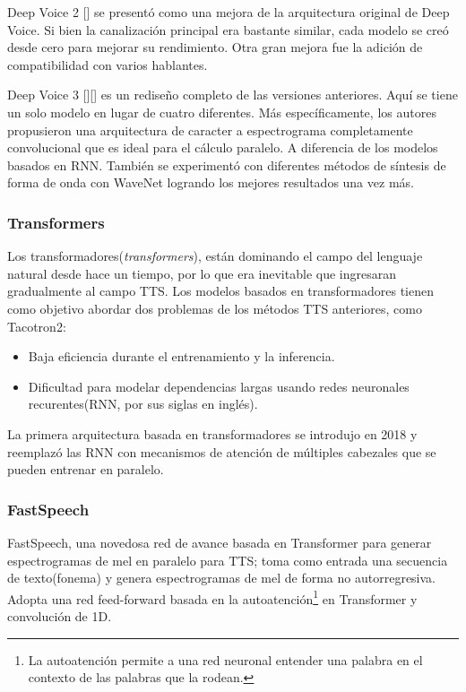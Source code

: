 Deep Voice 2 [\cite{arik2018neural}]  se presentó como una mejora de la arquitectura original de Deep Voice. Si bien la canalización principal era bastante similar, cada modelo se creó desde cero para mejorar su rendimiento. Otra gran mejora fue la adición de compatibilidad con varios hablantes.

Deep Voice 3 [\cite{arik2018neural}][\cite{deep-voice3}] es un rediseño completo de las versiones anteriores. Aquí se tiene un solo modelo en lugar de cuatro diferentes. Más específicamente, los autores propusieron una arquitectura de caracter a espectrograma completamente convolucional que es ideal para el cálculo paralelo. A diferencia de los modelos basados en RNN. También se experimentó con diferentes métodos de síntesis de forma de onda con WaveNet logrando los mejores resultados una vez más.

\subsubsection{Transformers}
Los transformadores(\textit{transformers}), están dominando el campo del lenguaje natural desde hace un tiempo, por lo que era inevitable que ingresaran gradualmente al campo TTS. Los modelos basados en transformadores tienen como objetivo abordar dos problemas de los métodos TTS anteriores, como Tacotron2:

\begin{itemize}
	\item Baja eficiencia durante el entrenamiento y la inferencia.
	\item Dificultad para modelar dependencias largas usando redes neuronales recurentes(RNN, por sus siglas en inglés).
\end{itemize}
La primera arquitectura basada en transformadores se introdujo en 2018 y reemplazó las RNN con mecanismos de atención de múltiples cabezales que se pueden entrenar en paralelo.

\subsubsection{FastSpeech}

FastSpeech, una novedosa red de avance basada en Transformer para generar espectrogramas de mel en paralelo para TTS; toma como entrada una secuencia de texto(fonema) y genera espectrogramas de mel de forma no autorregresiva. Adopta una red feed-forward basada en la autoatención\footnote{La autoatención permite a una red neuronal entender una palabra en el contexto de las palabras que la rodean.} en Transformer y convolución de 1D. 

